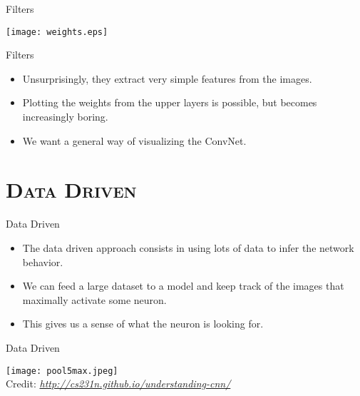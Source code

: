 \begin{frame}{Filters}
	\begin{center}
		\texttt{[image: weights.eps]}
	\end{center}
\end{frame}

\begin{frame}{Filters}
	\begin{itemize}
		\item Unsurprisingly, they extract very simple features from the images.
		\item Plotting the weights from the upper layers is possible, but becomes increasingly boring.
		\item We want a general way of visualizing the ConvNet.
	\end{itemize}
\end{frame}

\section{\scshape Data Driven}
\begin{frame}{Data Driven}
	\begin{itemize}
		\item The data driven approach consists in using lots of data to infer the network behavior.
		\item We can feed a large dataset to a model and keep track of the images that maximally activate some neuron.
		\item This gives us a sense of what the neuron is looking for.
	\end{itemize}
\end{frame}

\begin{frame}{Data Driven}
	\begin{center}
		\texttt{[image: pool5max.jpeg]}\\[-1ex]
		{\tiny Credit: {\itshape \url{http://cs231n.github.io/understanding-cnn/}}}
	\end{center}
\end{frame}

